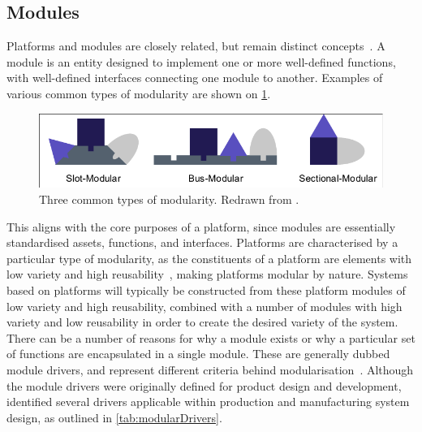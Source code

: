\subsection{Modules}
Platforms and modules are closely related, but remain distinct concepts~\parencite{DitlevModDrivers}.
A module is an entity designed to implement one or more well-defined functions, with well-defined interfaces connecting one module to another.
Examples of various common types of modularity are shown on \cref{fig:typesModularity}.
\begin{figure}[tb]
	\centering
	\includegraphics[width=.8\textwidth, trim=3 3 3 3, clip]{mainmatter/introduction/figures/modularity.pdf}
	\caption[Three common types of modularity.]
	{Three common types of modularity.
	Redrawn from \textcite{UlrichEppinger}.}\label{fig:typesModularity}
\end{figure}
This aligns with the core purposes of a platform, since modules are essentially standardised assets, functions, and interfaces.
Platforms are characterised by a particular type of modularity, as the constituents of a platform are elements with low variety and high reusability~\parencite{BaldwinWoodard2009}, making platforms modular by nature.
Systems based on platforms will typically be constructed from these platform modules of low variety and high reusability, combined with a number of modules with high variety and low reusability in order to create the desired variety of the system.
There can be a number of reasons for why a module exists or why a particular set of functions are encapsulated in a single module.
These are generally dubbed module drivers, and represent different criteria behind modularisation~\parencite{Erixon19961}.
Although the module drivers were originally defined for product design and development, \textcite{DitlevModDrivers} identified several drivers applicable within production and manufacturing system design, as outlined in \cref{tab:modularDrivers}.
